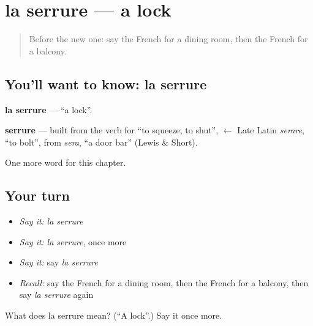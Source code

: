 \section[la serrure]{la serrure — a lock}

\label{lesson:FR-C163-serrure}



\begin{quote}
Before the new one: say the French for a dining room, then the French for a balcony.
\end{quote}

\subsection*{You'll want to know: la serrure}
\textbf{la serrure} — \textquotedblleft{}a lock\textquotedblright{}.

\begin{cousinweb}
\textbf{serrure} — built from the verb for \textquotedblleft{}to squeeze, to shut\textquotedblright{}, $\leftarrow$ Late Latin \emph{serare}, \textquotedblleft{}to bolt\textquotedblright{}, from \emph{sera}, \textquotedblleft{}a door bar\textquotedblright{} (Lewis \& Short).
\end{cousinweb}

\begin{grammarlens}[title={What you've built}]
One more word for this chapter.
\end{grammarlens}

\subsection*{Your turn}
\begin{itemize}
\raggedright
  \item \emph{Say it:} \emph{la serrure}
  \item \emph{Say it:} \emph{la serrure}, once more
  \item \emph{Say it:} say \emph{la serrure}
  \item \emph{Recall:} say the French for a dining room, then the French for a balcony, then say \emph{la serrure} again
\end{itemize}

\begin{tcolorbox}[breakable,colback=teal!4,colframe=teal!35!black,title={Before you move on}]
What does la serrure mean? (\textquotedblleft{}A lock\textquotedblright{}.) Say it once more.
\end{tcolorbox}
